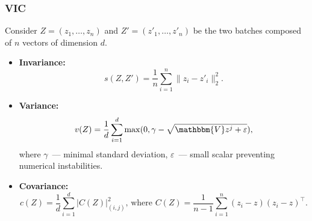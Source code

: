 \documentclass[13pt,aspectratio=169]{beamer}
\begin{document}
\begin{frame}
  \frametitle{VIC}

  Consider $Z = (z_1, \dots, z_n)$ and $Z' = (z'_1, \dots, z'_n)$ be the two
  batches composed of $n$ vectors of dimension $d$.

  \begin{itemize}
    \item \textbf{Invariance:}
      \begin{equation*}
	s(Z, Z') = \frac{1}{n}\sum_{i=1}^n \| z_i - z'_i \|_2^2.
      \end{equation*}

    \item \textbf{Variance:}
      \begin{equation*}
	v(Z) = \frac{1}{d} \sum_{i=1}^d \max (0, \gamma - \sqrt{\mathbbm{V}z^j + \varepsilon}),
      \end{equation*}
      where $\gamma$~--- minimal standard deviation,
      $\varepsilon$~--- small scalar preventing numerical instabilities.

    \item \textbf{Covariance:}
      \begin{equation*}
	c(Z) = \frac{1}{d} \sum_{i=1}^d | C(Z) |_{(i,j)}^2\text{, where }C(Z) = \frac{1}{n-1} \sum_{i=1}^n (z_i - z)(z_i - z)^{\intercal}.
      \end{equation*}
  \end{itemize}
\end{frame}
\end{document}
